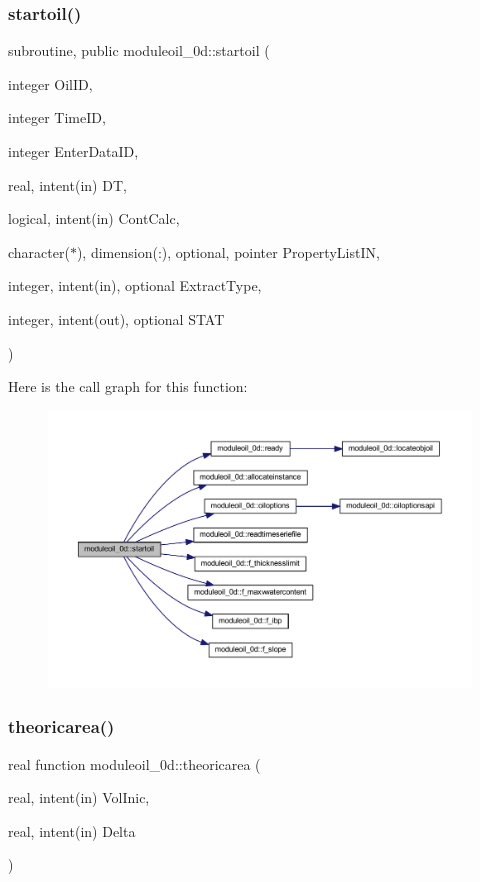 \subsubsection{\texorpdfstring{startoil()}{startoil()}}
{\footnotesize\ttfamily subroutine, public moduleoil\+\_\+0d\+::startoil (\begin{DoxyParamCaption}\item[{integer}]{Oil\+ID,  }\item[{integer}]{Time\+ID,  }\item[{integer}]{Enter\+Data\+ID,  }\item[{real, intent(in)}]{DT,  }\item[{logical, intent(in)}]{Cont\+Calc,  }\item[{character($\ast$), dimension(\+:), optional, pointer}]{Property\+List\+IN,  }\item[{integer, intent(in), optional}]{Extract\+Type,  }\item[{integer, intent(out), optional}]{S\+T\+AT }\end{DoxyParamCaption})}

Here is the call graph for this function\+:\nopagebreak
\begin{figure}[H]
\begin{center}
\leavevmode
\includegraphics[width=350pt]{namespacemoduleoil__0d_a7a8a1d1d956230a40fa8f10e664138e3_cgraph}
\end{center}
\end{figure}
\mbox{\label{namespacemoduleoil__0d_a45de73afad09d7f9580070bd1ef770e5}} 
\subsubsection{\texorpdfstring{theoricarea()}{theoricarea()}}
{\footnotesize\ttfamily real function moduleoil\+\_\+0d\+::theoricarea (\begin{DoxyParamCaption}\item[{real, intent(in)}]{Vol\+Inic,  }\item[{real, intent(in)}]{Delta }\end{DoxyParamCaption})\hspace{0.3cm}{\ttfamily [private]}}

